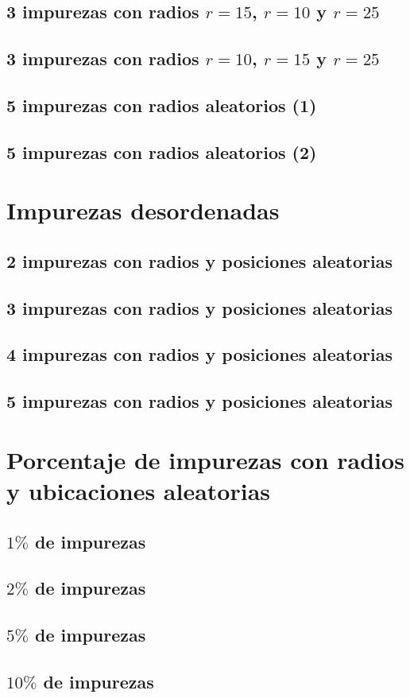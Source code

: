 \documentclass{article}
\begin{document}
\subsection{3 impurezas con radios $r=15$, $r=10$ y $r=25$}
\subsection{3 impurezas con radios $r=10$, $r=15$ y $r=25$}
\subsection{5 impurezas con radios aleatorios (1)}
\subsection{5 impurezas con radios aleatorios (2)}

\section{Impurezas desordenadas}
\subsection{2 impurezas con radios y posiciones aleatorias}
\subsection{3 impurezas con radios y posiciones aleatorias}
\subsection{4 impurezas con radios y posiciones aleatorias}
\subsection{5 impurezas con radios y posiciones aleatorias}

\section{Porcentaje de impurezas con radios y ubicaciones aleatorias}
\subsection{$1\% $ de impurezas}
\subsection{$2\% $ de impurezas}
\subsection{$5\% $ de impurezas}
\subsection{$10\% $ de impurezas}
\end{document}
